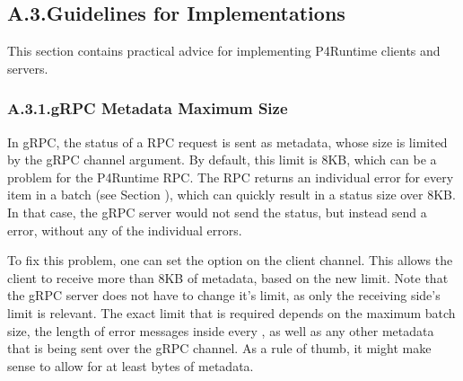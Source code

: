 \documentclass[11pt]{article}
\begin{document}
{%
\subsection{A.3.\hspace*{0.5em}Guidelines for Implementations}\label{sec-guidelines-for-implementations}%

\noindent{}This section contains practical advice for implementing P4Runtime clients and
servers.%

\subsubsection{A.3.1.\hspace*{0.5em}gRPC Metadata Maximum Size}\label{sec-grpc-metadata-maximum-size}%

\noindent{}In gRPC, the status of a RPC request is sent as metadata, whose size is limited
by the  gRPC channel argument.  By default, this limit
is 8KB, which can be a problem for the  P4Runtime RPC.  The  RPC
returns an individual error for every item in a batch (see Section
), which can quickly result in a status size over 8KB.  In that
case, the gRPC server would not send the status, but instead send a
 error, without any of the individual errors.%

To fix this problem, one can set the  option on the
client channel.  This allows the client to receive more than 8KB of metadata,
based on the new limit.  Note that the gRPC server does not have to change it's
limit, as only the receiving side's limit is relevant.  The exact limit that is
required depends on the maximum batch size, the length of error messages inside
every , as well as any other metadata that is being sent over the gRPC
channel.  As a rule of thumb, it might make sense to allow for at least
 bytes of metadata.%

}
\end{document}
